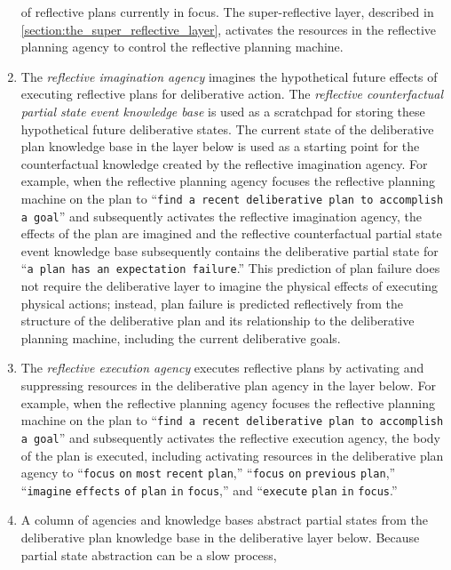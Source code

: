 \begin{enumerate}[~~A.]
  of reflective plans currently in focus.  The super-reflective layer,
  described in {\mbox{\autoref{section:the_super_reflective_layer}}},
  activates the resources in the reflective planning agency to control
  the reflective planning machine.
\item The {\emph{reflective imagination agency}} imagines the
  hypothetical future effects of executing reflective plans for
  deliberative action.  The {\emph{reflective counterfactual partial
      state event knowledge base}} is used as a scratchpad for storing
  these hypothetical future deliberative states.  The current state of
  the deliberative plan knowledge base in the layer below is used as a
  starting point for the counterfactual knowledge created by the
  reflective imagination agency.  For example, when the reflective
  planning agency focuses the reflective planning machine on the plan
  to ``{\tt{find a recent deliberative plan to accomplish a goal}}''
  and subsequently activates the reflective imagination agency, the
  effects of the plan are imagined and the reflective counterfactual
  partial state event knowledge base subsequently contains the
  deliberative partial state for ``{\tt{a plan has an expectation
      failure}}.''  This prediction of plan failure does not require
  the deliberative layer to imagine the physical effects of executing
  physical actions; instead, plan failure is predicted reflectively
  from the structure of the deliberative plan and its relationship to
  the deliberative planning machine, including the current
  deliberative goals.
\item The {\emph{reflective execution agency}} executes reflective
  plans by activating and suppressing resources in the deliberative
  plan agency in the layer below.  For example, when the reflective
  planning agency focuses the reflective planning machine on the plan
  to ``{\tt{find a recent deliberative plan to accomplish a goal}}''
  and subsequently activates the reflective execution agency, the body
  of the plan is executed, including activating resources in the
  deliberative plan agency to ``{\tt{focus}} {\tt{on}} {\tt{most}}
  {\tt{recent}} {\tt{plan}},'' ``{\tt{focus}} {\tt{on}}
  {\tt{previous}} {\tt{plan}},'' ``{\tt{imagine}} {\tt{effects}}
  {\tt{of}} {\tt{plan}} {\tt{in}} {\tt{focus}},'' and ``{\tt{execute}}
  {\tt{plan}} {\tt{in}} {\tt{focus}}.''
\item A column of agencies and knowledge bases abstract partial states
  from the deliberative plan knowledge base in the deliberative layer
  below.  Because partial state abstraction can be a slow process,

\end{enumerate}

